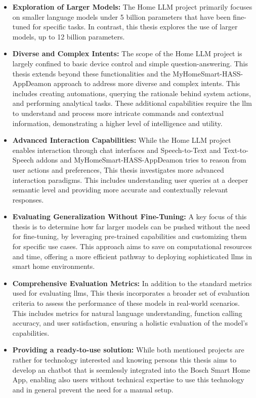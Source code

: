 \begin{itemize}
\item \textbf{Exploration of Larger Models:} The Home LLM project primarily focuses on smaller language models under 5 billion parameters that have been fine-tuned for specific tasks. In contrast, this thesis explores the use of larger models, up to 12 billion parameters.

\item \textbf{Diverse and Complex Intents:} The scope of the Home LLM project is largely confined to basic device control and simple question-answering. This thesis extends beyond these functionalities and the MyHomeSmart-HASS-AppDeamon approach to address more diverse and complex intents. This includes creating automations, querying the rationale behind system actions, and performing analytical tasks. These additional capabilities require the \gls{llm} to understand and process more intricate commands and contextual information, demonstrating a higher level of intelligence and utility.

\item \textbf{Advanced Interaction Capabilities:} While the Home LLM project enables interaction through chat interfaces and Speech-to-Text and Text-to-Speech addons and MyHomeSmart-HASS-AppDeamon tries to reason from user actions and preferences, This thesis investigates more advanced interaction paradigms. This includes understanding user queries at a deeper semantic level and providing more accurate and contextually relevant responses.

\item \textbf{Evaluating Generalization Without Fine-Tuning:} A key focus of this thesis is to determine how far larger models can be pushed without the need for fine-tuning, by leveraging pre-trained capabilities and customizing them for specific use cases. This approach aims to save on computational resources and time, offering a more efficient pathway to deploying sophisticated \glspl{llm} in smart home environments.

\item \textbf{Comprehensive Evaluation Metrics:} In addition to the standard metrics used for evaluating \glspl{llm}, This thesis incorporates a broader set of evaluation criteria to assess the performance of these models in real-world scenarios. This includes metrics for natural language understanding, function calling accuracy, and user satisfaction, ensuring a holistic evaluation of the model's capabilities.

\item \textbf{Providing a ready-to-use solution:} While both mentioned projects are rather for technology interested and knowing persons this thesis aims to develop an chatbot that is seemlessly integrated into the Bosch Smart Home App, enabling also users without technical expertise to use this technology and in general prevent the need for a manual setup.
\end{itemize}

